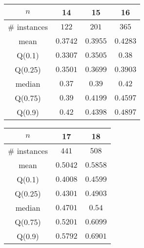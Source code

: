 \begin{tabular}{c|ccc} 
\hline 
$n$ & 14 & 15 & 16 \tabularnewline 
\hline 
\hline 
\# instances & $122$ & $201$ & $365$ \tabularnewline 
mean & $0.3742$ & $0.3955$ & $0.4283$ \tabularnewline 
Q(0.1) & $0.3307$ & $0.3505$ & $0.38$ \tabularnewline 
Q(0.25) & $0.3501$ & $0.3699$ & $0.3903$ \tabularnewline 
median & $0.37$ & $0.39$ & $0.42$ \tabularnewline 
Q(0.75) & $0.39$ & $0.4199$ & $0.4597$ \tabularnewline 
Q(0.9) & $0.42$ & $0.4398$ & $0.4897$ \tabularnewline 
\hline 
\end{tabular} 
\medskip{} 

\begin{tabular}{c|cc} 
\hline 
$n$ & 17 & 18 \tabularnewline 
\hline 
\hline 
\# instances & $441$ & $508$ \tabularnewline 
mean & $0.5042$ & $0.5858$ \tabularnewline 
Q(0.1) & $0.4008$ & $0.4599$ \tabularnewline 
Q(0.25) & $0.4301$ & $0.4903$ \tabularnewline 
median & $0.4701$ & $0.54$ \tabularnewline 
Q(0.75) & $0.5201$ & $0.6099$ \tabularnewline 
Q(0.9) & $0.5792$ & $0.6901$ \tabularnewline 
\hline 
\end{tabular} 
\medskip{} 

